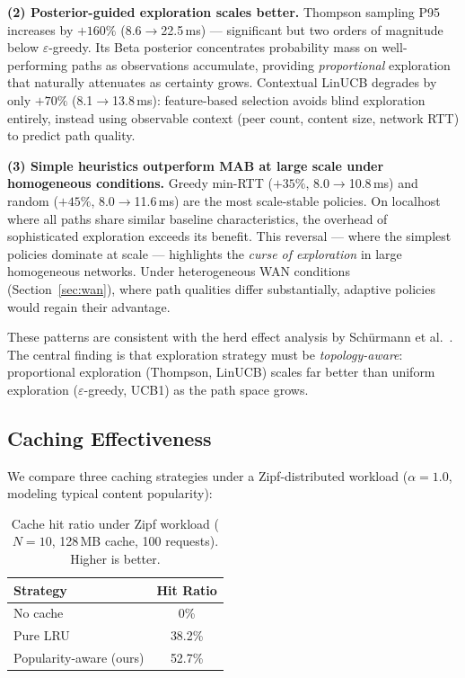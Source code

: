 \documentclass[sigconf,nonacm]{acmart}
\begin{document}
\textbf{(2) Posterior-guided exploration scales better.} Thompson sampling P95 increases by $+160\%$ (8.6$\to$22.5\,ms) --- significant but two orders of magnitude below $\varepsilon$-greedy. Its Beta posterior concentrates probability mass on well-performing paths as observations accumulate, providing \emph{proportional} exploration that naturally attenuates as certainty grows. Contextual LinUCB degrades by only $+70\%$ (8.1$\to$13.8\,ms): feature-based selection avoids blind exploration entirely, instead using observable context (peer count, content size, network RTT) to predict path quality.

\textbf{(3) Simple heuristics outperform MAB at large scale under homogeneous conditions.} Greedy min-RTT ($+35\%$, 8.0$\to$10.8\,ms) and random ($+45\%$, 8.0$\to$11.6\,ms) are the most scale-stable policies. On localhost where all paths share similar baseline characteristics, the overhead of sophisticated exploration exceeds its benefit. This reversal --- where the simplest policies dominate at scale --- highlights the \emph{curse of exploration} in large homogeneous networks. Under heterogeneous WAN conditions (Section~\ref{sec:wan}), where path qualities differ substantially, adaptive policies would regain their advantage.

These patterns are consistent with the herd effect analysis by Sch\"{u}rmann et al.~\cite{pathselection2025}. The central finding is that exploration strategy must be \emph{topology-aware}: proportional exploration (Thompson, LinUCB) scales far better than uniform exploration ($\varepsilon$-greedy, UCB1) as the path space grows.

\subsection{Caching Effectiveness}

We compare three caching strategies under a Zipf-distributed workload ($\alpha = 1.0$, modeling typical content popularity):

\begin{table}[t]
\caption{Cache hit ratio under Zipf workload ($N = 10$, 128\,MB cache, 100 requests). Higher is better.}
\label{tab:caching}
\centering
\begin{tabular}{lc}
\toprule
Strategy & Hit Ratio \\
\midrule
No cache & 0\% \\
Pure LRU & 38.2\% \\
Popularity-aware (ours) & 52.7\% \\
\bottomrule
\end{tabular}
\end{table}
\end{document}
